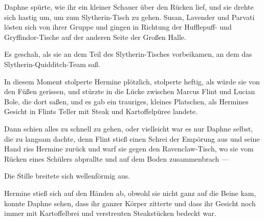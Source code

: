 Daphne spürte, wie ihr ein kleiner Schauer über den Rücken lief, und sie drehte sich hastig um, um zum Slytherin-Tisch zu gehen. Susan, Lavender und Parvati lösten sich von ihrer Gruppe und gingen in Richtung der Hufflepuff- und Gryffindor-Tische auf der anderen Seite der Großen Halle.

Es geschah, als sie an dem Teil des Slytherin-Tisches vorbeikamen, an dem das Slytherin-Quidditch-Team saß.

In diesem Moment stolperte Hermine plötzlich, stolperte heftig, als würde sie von den Füßen gerissen, und stürzte in die Lücke zwischen Marcus Flint und Lucian Bole, die dort saßen, und es gab ein trauriges, kleines Platschen, als Hermines Gesicht in Flints Teller mit Steak und Kartoffelpüree landete.

Dann schien alles zu schnell zu gehen, oder vielleicht war es nur Daphne selbst, die zu langsam dachte, denn Flint stieß einen Schrei der Empörung aus und seine Hand riss Hermine zurück und warf sie gegen den Ravenclaw-Tisch, wo sie vom Rücken eines Schülers abprallte und auf dem Boden zusammenbrach —

Die Stille breitete sich wellenförmig aus.

Hermine stieß sich auf den Händen ab, obwohl sie nicht ganz auf die Beine kam, konnte Daphne sehen, dass ihr ganzer Körper zitterte und dass ihr Gesicht noch immer mit Kartoffelbrei und verstreuten Steakstücken bedeckt war.

